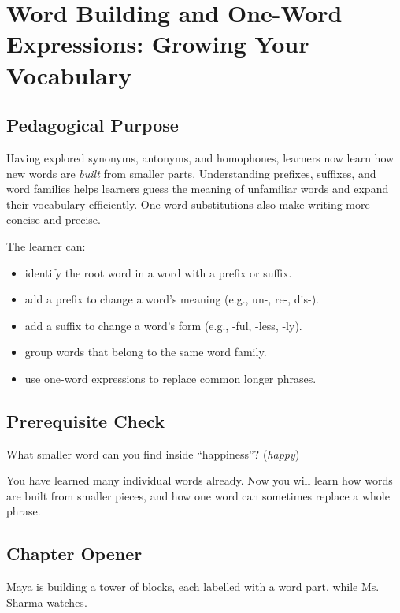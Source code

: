 
\chapter{Word Building and One-Word Expressions: Growing Your Vocabulary}

\section{Pedagogical Purpose}
Having explored synonyms, antonyms, and homophones, learners now learn how new words are \textit{built} from smaller parts. Understanding prefixes, suffixes, and word families helps learners guess the meaning of unfamiliar words and expand their vocabulary efficiently. One-word substitutions also make writing more concise and precise.

\begin{learningobjectives}
The learner can:
\begin{itemize}
    \item identify the root word in a word with a prefix or suffix.
    \item add a prefix to change a word's meaning (e.g., un-, re-, dis-).
    \item add a suffix to change a word's form (e.g., -ful, -less, -ly).
    \item group words that belong to the same word family.
    \item use one-word expressions to replace common longer phrases.
\end{itemize}
\end{learningobjectives}

\section{Prerequisite Check}
\begin{quickcheck}
What smaller word can you find inside ``happiness''? (\textit{happy})
\end{quickcheck}

\begin{rememberbox}
You have learned many individual words already. Now you will learn how words are built from smaller pieces, and how one word can sometimes replace a whole phrase.
\end{rememberbox}

\section{Chapter Opener}
Maya is building a tower of blocks, each labelled with a word part, while Ms. Sharma watches.

